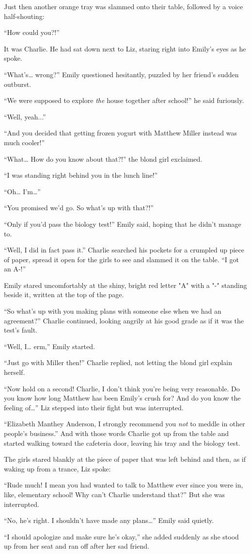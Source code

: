 Just then another orange tray was slammed onto their table, followed by a voice half-shouting:

“How could you?!”

It was Charlie. He had sat down next to Liz, staring right into Emily's eyes as he spoke.

“What's… wrong?” Emily questioned hesitantly, puzzled by her friend's sudden outburst.

“We were supposed to explore \textit{the} house together after school!” he said furiously.

“Well, yeah...”

“And you decided that getting frozen yogurt with Matthew Miller instead was much cooler!”

“What… How do you know about that?!” the blond girl exclaimed.

“I was standing right behind you in the lunch line!”

“Oh… I'm…”

“You promised we'd go. So what's up with that?!”

“Only if you'd pass the biology test!” Emily said, hoping that he didn't manage to.

“Well, I did in fact pass it.” Charlie searched his pockets for a crumpled up piece of paper, spread it open for the girls to see and slammed it on the table. “I got an A-!”

Emily stared uncomfortably at the shiny, bright red letter "A" with a "-" standing beside it, written at the top of the page.

“So what's up with you making plans with someone else when we had an agreement?” Charlie continued, looking angrily at his good grade as if it was the test's fault.

“Well, I… erm,” Emily started.

“Just go with Miller then!” Charlie replied, not letting the blond girl explain herself.

“Now hold on a second! Charlie, I don't think you're being very reasonable. Do you know how long Matthew has been Emily's crush for? And do you know the feeling of…” Liz stepped into their fight but was interrupted.

“Elizabeth Manthey Anderson, I strongly recommend you \textit{not} to meddle in other people's business.” And with those words Charlie got up from the table and started walking toward the cafeteria door, leaving his tray and the biology test.

The girls stared blankly at the piece of paper that was left behind and then, as if waking up from a trance, Liz spoke:

“Rude much! I mean you had wanted to talk to Matthew ever since you were in, like, elementary school! Why can't Charlie understand that?” But she was interrupted.

“No, he's right. I shouldn't have made any plans…” Emily said quietly.

“I should apologize and make sure he's okay,” she added suddenly as she stood up from her seat and ran off after her sad friend.